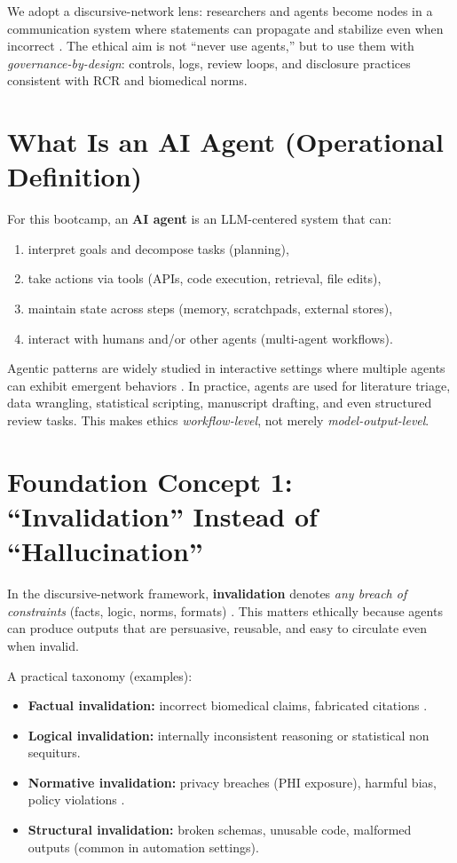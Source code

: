 \documentclass[11pt]{article}
\begin{document}
We adopt a discursive-network lens: researchers and agents become nodes in a communication system where statements can propagate and stabilize even when incorrect \citep{gutierrez2025}. The ethical aim is not ``never use agents,'' but to use them with \emph{governance-by-design}: controls, logs, review loops, and disclosure practices consistent with RCR and biomedical norms.

\section{What Is an AI Agent (Operational Definition)}
For this bootcamp, an \textbf{AI agent} is an LLM-centered system that can:
\begin{enumerate}[label=\alph*)]
\item interpret goals and decompose tasks (planning),
\item take actions via tools (APIs, code execution, retrieval, file edits),
\item maintain state across steps (memory, scratchpads, external stores),
\item interact with humans and/or other agents (multi-agent workflows).
\end{enumerate}

Agentic patterns are widely studied in interactive settings where multiple agents can exhibit emergent behaviors \citep{park2023}. In practice, agents are used for literature triage, data wrangling, statistical scripting, manuscript drafting, and even structured review tasks. This makes ethics \emph{workflow-level}, not merely \emph{model-output-level}.

\section{Foundation Concept 1: ``Invalidation'' Instead of ``Hallucination''}
In the discursive-network framework, \textbf{invalidation} denotes \emph{any breach of constraints} (facts, logic, norms, formats) \citep{gutierrez2025}. This matters ethically because agents can produce outputs that are persuasive, reusable, and easy to circulate even when invalid.

A practical taxonomy (examples):
\begin{itemize}
\item \textbf{Factual invalidation:} incorrect biomedical claims, fabricated citations \citep{ji2023survey}.
\item \textbf{Logical invalidation:} internally inconsistent reasoning or statistical non sequiturs.
\item \textbf{Normative invalidation:} privacy breaches (PHI exposure), harmful bias, policy violations \citep{bender2021, weidinger2021}.
\item \textbf{Structural invalidation:} broken schemas, unusable code, malformed outputs (common in automation settings).
\end{itemize}
\end{document}
